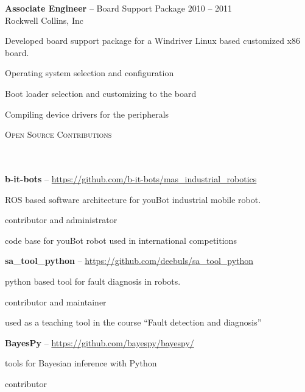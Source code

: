 \documentclass{article}
\newcommand{\header}[1]{{
\hspace*{-15pt}\vspace*{6pt} \textsc{#1}} \vspace*{-6pt} 
\lineunder
}
\newcommand{\lineunder}{
\vspace*{-8pt} \\ \hspace*{-18pt} 
\hrulefill \\
}
\newcommand{\employer}[4]{{
\vspace*{2pt}%
\textbf{#1} #2 \hfill #3\\ #4 \vspace*{2pt}}
}
\renewcommand{\labelitemii}{
$\vcenter{\hbox{\tiny$\bullet$}}$\hspace*{-3pt}
}
\newenvironment{bullet-list-minor}{
\begin{list}{\labelitemii}{\setlength\leftmargin{15pt} 
\topsep 0pt \itemsep -2pt}}{\vspace*{4pt}\end{list}
}
\begin{document}
    \employer{Associate Engineer}{-- Board Support Package}{2010 -- 2011}
    {Rockwell Collins, Inc}
    \begin{bullet-list-minor}
    \item Developed board support package for a Windriver Linux based customized x86 board.
    \item Operating system selection and configuration 
    \item Boot loader selection and customizing to the board 
    \item Compiling device drivers for the peripherals 
    \end{bullet-list-minor}
    
\vspace*{4pt}%
\header{Open Source Contributions}

\employer{b-it-bots}{-- \url{https://github.com/b-it-bots/mas\_industrial\_robotics}}{}{}
\begin{bullet-list-minor}
    \item ROS based software architecture for youBot industrial mobile robot.
    \item contributor and administrator
    \item code base for youBot robot used in international competitions
\end{bullet-list-minor}
\employer{sa\_tool\_python}{-- \url{https://github.com/deebuls/sa_tool_python} }{}
    {}
    \begin{bullet-list-minor}
    \item python based tool for fault diagnosis in robots.
    \item contributor and maintainer
    \item used as a teaching tool in the course ``Fault detection and diagnosis''
    \end{bullet-list-minor}

\employer{BayesPy}{-- \url{https://github.com/bayespy/bayespy/}}{}{}    
    \begin{bullet-list-minor}
    \item tools for Bayesian inference with Python
    \item contributor
    \end{bullet-list-minor}
    
\end{document}

